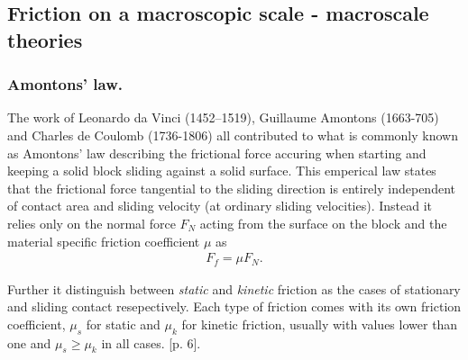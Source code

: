 
\subsection{Friction on a macroscopic scale - macroscale theories}
\subsubsection {Amontons’ law. }
 The work of Leonardo da Vinci (1452–1519), Guillaume Amontons (1663-705) and Charles de Coulomb (1736-1806) all contributed to what is
 commonly known as Amontons’ law describing the frictional force accuring when starting and keeping a solid block sliding against a solid
 surface. This emperical law states that the frictional force tangential to the sliding direction is entirely independent of contact area
 and sliding velocity (at ordinary sliding velocities). Instead it relies only on the normal force $F_N$ acting from the surface on the
 block and the material specific friction coefficient $\mu$ as
\begin{align*}
  F_f = \mu F_N.
\end{align*}

Further it distinguish between \textit{static} and \textit{kinetic} friction as the cases of stationary and sliding contact resepectively.
Each type of friction comes with its own friction coefficient, $\mu_s$ for static and $\mu_k$ for kinetic friction, usually with values
lower than one and $\mu_s \ge \mu_k$ in all cases. \cite{gnecco_meyer_2015}[p. 6]. \\

